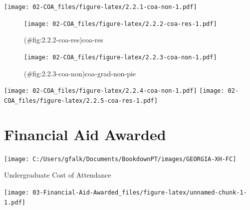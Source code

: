 \documentclass[
]{book}
\begin{document}
\texttt{[image: 02-COA\_files/figure-latex/2.2.1-coa-non-1.pdf]}

\begin{figure}
\centering
\texttt{[image: 02-COA\_files/figure-latex/2.2.2-coa-res-1.pdf]}
\caption{(\#fig:2.2.2-coa-res)coa-res}
\end{figure}

\begin{figure}
\centering
\texttt{[image: 02-COA\_files/figure-latex/2.2.3-coa-non-1.pdf]}
\caption{(\#fig:2.2.3-coa-non)coa-grad-non-pie}
\end{figure}

\texttt{[image: 02-COA\_files/figure-latex/2.2.4-coa-non-1.pdf]}
\texttt{[image: 02-COA\_files/figure-latex/2.2.5-coa-res-1.pdf]}

\hypertarget{financial-aid-awarded}{%
\chapter{Financial Aid Awarded}\label{financial-aid-awarded}}

\texttt{[image: C:/Users/gfalk/Documents/BookdownPT/images/GEORGIA-XH-FC]}

Undergraduate Cost of Attendance

\texttt{[image: 03-Financial-Aid-Awarded\_files/figure-latex/unnamed-chunk-1-1.pdf]}
\end{document}
